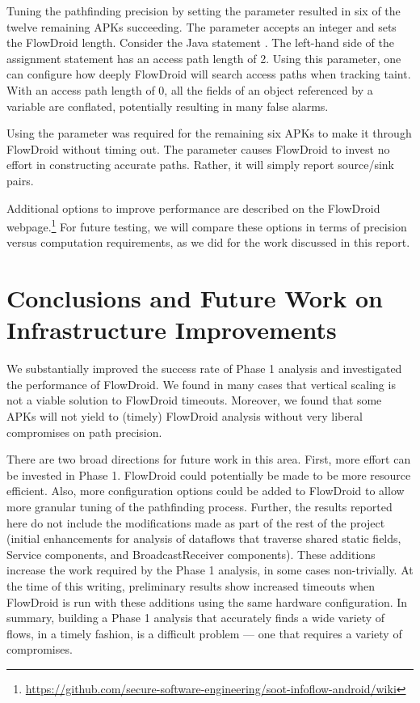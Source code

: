 Tuning the pathfinding precision by setting the  parameter resulted in six of the twelve remaining APKs succeeding. The  parameter accepts an integer and sets the FlowDroid  length. Consider the Java statement . The left-hand side of the assignment statement has an access path length of 2. Using this parameter, one can configure how deeply FlowDroid will search access paths when tracking taint. With an access path length of 0, all the fields of an object referenced by a variable are conflated, potentially resulting in many false alarms.

Using the  parameter was required for the remaining six APKs to make it through FlowDroid without timing out. The  parameter causes FlowDroid to invest no effort in constructing accurate paths. Rather, it will simply report source/sink pairs. 

Additional options to improve performance are described on the FlowDroid webpage.\footnote{\url{https://github.com/secure-software-engineering/soot-infoflow-android/wiki}} For future testing, we will compare these options in terms of precision versus computation requirements, as we did for the work discussed in this report.


\section{Conclusions and Future Work on Infrastructure Improvements}
We substantially improved the success rate of Phase 1 analysis and investigated the performance of FlowDroid.  We found in many cases that vertical scaling is not a viable solution to FlowDroid timeouts.  Moreover, we found that some APKs will not yield to (timely) FlowDroid analysis without very liberal compromises on path precision.

There are two broad directions for future work in this area.  First, more effort can be invested in Phase 1.  FlowDroid could potentially be made to be more resource efficient.  Also, more configuration options could be added to FlowDroid to allow more granular tuning of the pathfinding process.  Further, the results reported here do not include the modifications made as part of the rest of the project (initial enhancements for analysis of dataflows that traverse shared static fields, Service components, and BroadcastReceiver components).  These additions increase the work required by the Phase 1 analysis, in some cases non-trivially.  At the time of this writing, preliminary results show increased timeouts when FlowDroid is run with these additions using the same hardware configuration.  In summary, building a Phase 1 analysis that accurately finds a wide variety of flows, in a timely fashion, is a difficult problem --- one that requires a variety of compromises. 

